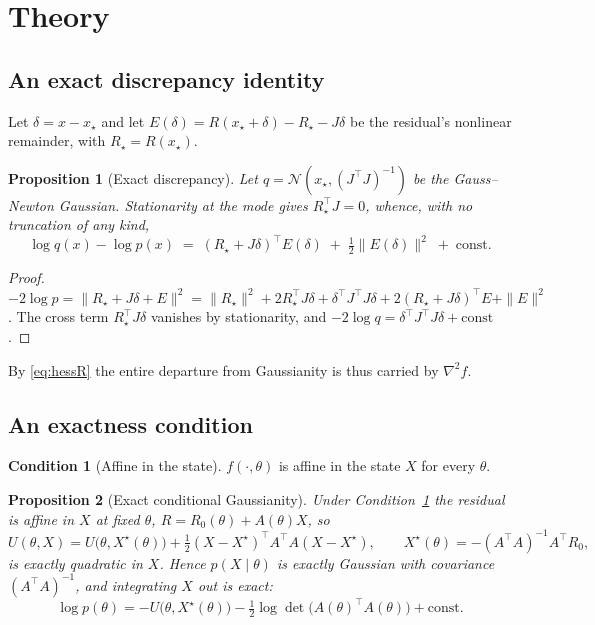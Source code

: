 \documentclass[11pt]{article}
\newcommand{\xmap}{x_{\star}}
\theoremstyle{plain}
\newtheorem{proposition}{Proposition}
\theoremstyle{definition}
\newtheorem{condition}{Condition}
\theoremstyle{remark}
\begin{document}
\section{Theory}
\label{sec:theory}

\subsection{An exact discrepancy identity}

Let $\delta = x - \xmap$ and let $E(\delta) = R(\xmap+\delta) - R_\star - J\delta$ be the residual's
nonlinear remainder, with $R_\star = R(\xmap)$.

\begin{proposition}[Exact discrepancy]
\label{prop:identity}
Let $q = \mathcal{N}(\xmap, (J^\top J)^{-1})$ be the Gauss--Newton Gaussian. Stationarity at the mode
gives $R_\star^\top J = 0$, whence, with no truncation of any kind,
\begin{equation}
\label{eq:identity}
  \log q(x) - \log p(x) \;=\; (R_\star + J\delta)^\top E(\delta) \;+\; \tfrac12\|E(\delta)\|^2 \;+\; \text{const}.
\end{equation}
\end{proposition}

\begin{proof}
$-2\log p = \|R_\star + J\delta + E\|^2 = \|R_\star\|^2 + 2R_\star^\top J\delta + \delta^\top J^\top
J\delta + 2(R_\star+J\delta)^\top E + \|E\|^2$. The cross term $R_\star^\top J\delta$ vanishes by
stationarity, and $-2\log q = \delta^\top J^\top J \delta + \text{const}$.
\end{proof}

By \eqref{eq:hessR} the entire departure from Gaussianity is thus carried by $\nabla^2 f$.

\subsection{An exactness condition}

\begin{condition}[Affine in the state]
\label{cond:A}
$f(\cdot,\theta)$ is affine in the state $X$ for every $\theta$.
\end{condition}

\begin{proposition}[Exact conditional Gaussianity]
\label{prop:condA}
Under Condition~\ref{cond:A} the residual is affine in $X$ at fixed $\theta$, $R = R_0(\theta) +
A(\theta)X$, so
\[
  U(\theta,X) = U\big(\theta,X^\star(\theta)\big) + \tfrac12(X-X^\star)^\top A^\top A (X-X^\star),
  \qquad X^\star(\theta) = -(A^\top A)^{-1}A^\top R_0,
\]
is exactly quadratic in $X$. Hence $p(X\mid\theta)$ is exactly Gaussian with covariance
$(A^\top A)^{-1}$, and integrating $X$ out is exact:
\begin{equation}
\label{eq:marginal}
  \log p(\theta) = -U\big(\theta, X^\star(\theta)\big) - \tfrac12\log\det\!\big(A(\theta)^\top A(\theta)\big) + \text{const}.
\end{equation}
\end{proposition}
\end{document}
